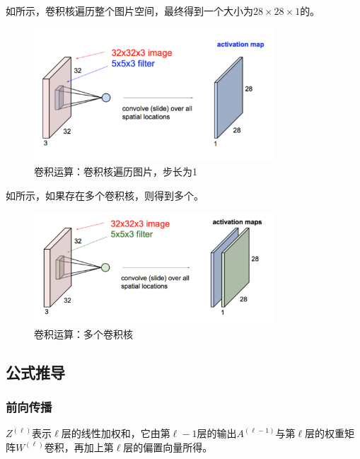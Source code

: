 \begin{content}
如所示，卷积核遍历整个图片空间，最终得到一个大小为$28 \times 28 \times 1$的。

\begin{figure}[H]
\centering
\includegraphics[width=0.8\textwidth]{figures/convolutional-layer-3.png}
\caption{卷积运算：卷积核遍历图片，步长为1}
 \label{fig:mnist-conv-ndot}
\end{figure}

如所示，如果存在多个卷积核，则得到多个。

\begin{figure}[H]
\centering
\includegraphics[width=0.8\textwidth]{figures/convolutional-layer-4.png}
\caption{卷积运算：多个卷积核}
 \label{fig:mnist-conv-multi-filters}
\end{figure}

\subsection{公式推导}

\subsubsection{前向传播}

$Z^{(\ell )}$表示$\ell$层的线性加权和，它由第$\ell - 1$层的输出$A^{(\ell  - 1)}$与第$\ell$层的权重矩阵$W^{(\ell )}$卷积，再加上第$\ell$层的偏置向量所得。


\end{content}
